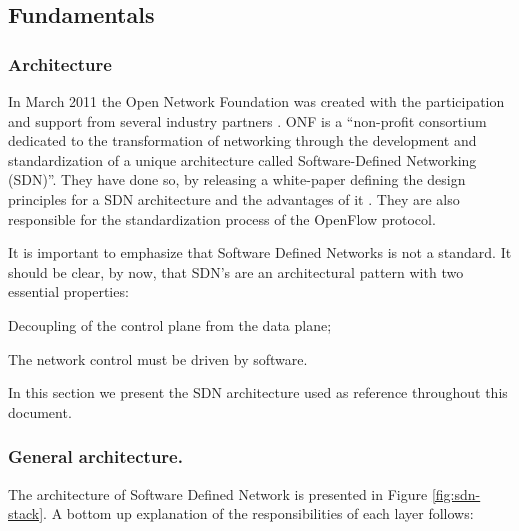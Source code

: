 \begin{itemize}
\begin{itemize}

\end{itemize}

\subsection{Fundamentals}

\subsubsection{Architecture}
In March 2011 the Open Network Foundation was created with the
participation and support from several industry partners \cite{onf}. ONF  is a ``non-profit consortium
dedicated to the transformation of networking through the development
and standardization of a unique architecture called Software-Defined
Networking (SDN)''. They have done so, by releasing a white-paper
defining the design principles for a SDN architecture and the
advantages of it \cite{ONF:2012ui}. They are also responsible for the standardization
process of the OpenFlow protocol.

It is important to emphasize that Software Defined Networks is not a
standard. It should be
clear, by now, that SDN's are an architectural pattern with two
essential properties:

\begin{itemize*}
\item Decoupling of the control plane from the data plane;
\item The network control must be driven by software.
\end{itemize*}

In this section we present the SDN architecture used as reference throughout this document.  

\subsubsection{General architecture.} The architecture of Software Defined Network is presented in Figure
\ref{fig:sdn-stack}. A bottom up explanation of the responsibilities of
each layer follows:


\end{itemize}
